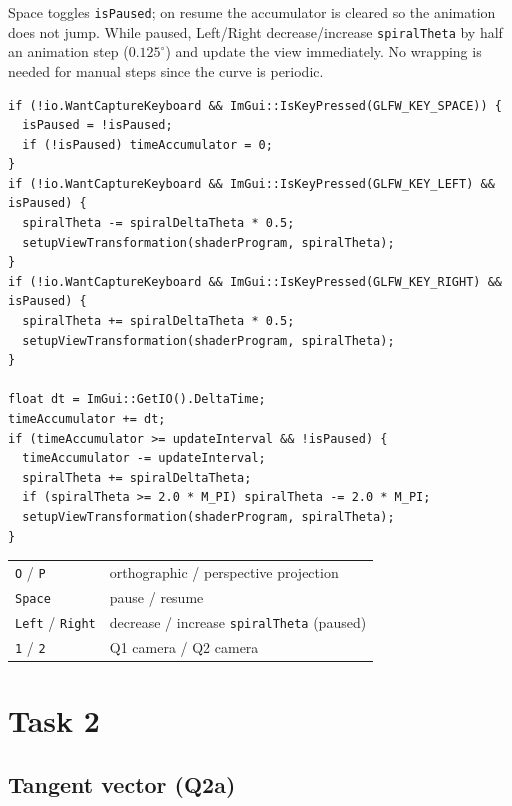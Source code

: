\documentclass[acmlarge]{acmart}
\begin{document}
Space toggles \texttt{isPaused}; on resume the accumulator is cleared so the
animation does not jump. While paused, Left/Right decrease/increase
\texttt{spiralTheta} by half an animation step ($0.125^\circ$) and update the
view immediately. No wrapping is needed for manual steps since the curve is
periodic.
\begin{lstlisting}
if (!io.WantCaptureKeyboard && ImGui::IsKeyPressed(GLFW_KEY_SPACE)) {
  isPaused = !isPaused;
  if (!isPaused) timeAccumulator = 0;
}
if (!io.WantCaptureKeyboard && ImGui::IsKeyPressed(GLFW_KEY_LEFT) && isPaused) {
  spiralTheta -= spiralDeltaTheta * 0.5;
  setupViewTransformation(shaderProgram, spiralTheta);
}
if (!io.WantCaptureKeyboard && ImGui::IsKeyPressed(GLFW_KEY_RIGHT) && isPaused) {
  spiralTheta += spiralDeltaTheta * 0.5;
  setupViewTransformation(shaderProgram, spiralTheta);
}

float dt = ImGui::GetIO().DeltaTime;
timeAccumulator += dt;
if (timeAccumulator >= updateInterval && !isPaused) {
  timeAccumulator -= updateInterval;
  spiralTheta += spiralDeltaTheta;
  if (spiralTheta >= 2.0 * M_PI) spiralTheta -= 2.0 * M_PI;
  setupViewTransformation(shaderProgram, spiralTheta);
}
\end{lstlisting}

\begin{center}
\begin{tabular}{@{}ll@{}}
\texttt{O} / \texttt{P} & orthographic / perspective projection\\
\texttt{Space} & pause / resume\\
\texttt{Left} / \texttt{Right} & decrease / increase \texttt{spiralTheta} (paused)\\
\texttt{1} / \texttt{2} & Q1 camera / Q2 camera\\
\end{tabular}
\end{center}

\section{Task 2}

\subsection{Tangent vector (Q2a)}
\end{document}
